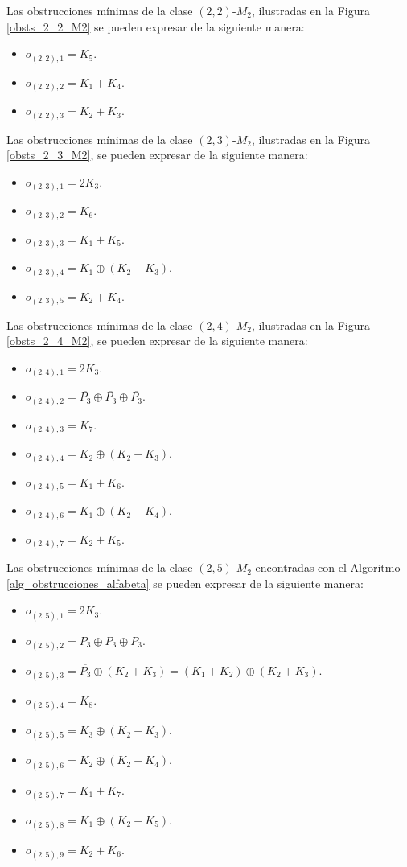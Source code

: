 

Las obstrucciones mínimas de la clase $(2,2)$-$M_2$, ilustradas en la Figura \ref{obsts_2_2_M2} se pueden expresar de la siguiente manera:
\begin{itemize}
    \item $o_{(2,2),1}=K_5$.
    \item $o_{(2,2),2}=K_1+K_4$.
    \item $o_{(2,2),3}=K_2+K_3$.
\end{itemize}



Las obstrucciones mínimas de la clase $(2,3)$-$M_2$, ilustradas en la Figura \ref{obsts_2_3_M2}, se pueden expresar de la siguiente manera:
\begin{itemize}
    \item $o_{(2,3),1}=2K_3$.
    \item $o_{(2,3),2}=K_6$.
    \item $o_{(2,3),3}=K_1+K_5$.
    \item $o_{(2,3),4}=K_1\oplus(K_2+K_3)$.
    \item $o_{(2,3),5}=K_2+K_4$.
\end{itemize}



Las obstrucciones mínimas de la clase $(2,4)$-$M_2$, ilustradas en la Figura \ref{obsts_2_4_M2}, se pueden expresar de la siguiente manera:
\begin{itemize}
    \item $o_{(2,4),1}=2K_3$.
    \item $o_{(2,4),2}=\overline{P_3}\oplus\overline{P_3}\oplus\overline{P_3}$.
    \item $o_{(2,4),3}=K_7$.
    \item $o_{(2,4),4}=K_2\oplus(K_2+K_3)$.
    \item $o_{(2,4),5}=K_1+K_6$.
    \item $o_{(2,4),6}=K_1\oplus(K_2+K_4)$.
    \item $o_{(2,4),7}=K_2+K_5$.
\end{itemize}


Las obstrucciones mínimas de la clase $(2,5)$-$M_2$ encontradas con el Algoritmo \ref{alg_obstrucciones_alfabeta} se pueden expresar de la siguiente manera:
\begin{itemize}
    \item $o_{(2,5),1}=2K_3$.
    \item $o_{(2,5),2}=\overline{P_3}\oplus\overline{P_3}\oplus\overline{P_3}$.
    \item $o_{(2,5),3}=\overline{P_3}\oplus(K_2+K_3)=(K_1+K_2)\oplus(K_2+K_3)$.
    \item $o_{(2,5),4}=K_8$.
    \item $o_{(2,5),5}=K_3\oplus(K_2+K_3)$.
    \item $o_{(2,5),6}=K_2\oplus(K_2+K_4)$.
    \item $o_{(2,5),7}=K_1+K_7$.
    \item $o_{(2,5),8}=K_1\oplus(K_2+K_5)$.
    \item $o_{(2,5),9}=K_2+K_6$.
\end{itemize}

